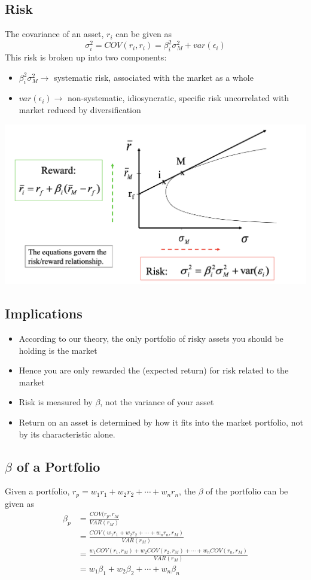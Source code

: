 \documentclass[11pt]{article}
\begin{document}
\subsection{Risk}
The covariance of an asset, $r_i$ can be given as 
$$ \sigma_i^2 = COV(r_i, r_i) = \beta_i^2\sigma^2_M + var(\epsilon_i)$$
This risk is broken up into two components:
\begin{itemize}
\item $\beta_i^2\sigma^2_M \rightarrow $ systematic risk, associated with the market as a whole
\item $ var(\epsilon_i) \rightarrow $ non-systematic,  idiosyncratic, specific risk uncorrelated with market reduced by diversification
\end{itemize}
\begin{center}
\includegraphics[scale=0.4]{images/rkrw.png} 
\end{center}

\subsection{Implications}
\begin{itemize}
\item According to our theory, the only portfolio of risky assets you should be holding is the market
\item Hence you are only rewarded the (expected return) for risk related to the market 
\item Risk is measured by $\beta$, not the variance of your asset
\item Return on an asset is determined by how it fits into the market portfolio, not by its characteristic alone.
\end{itemize}

\subsection{$\beta$ of a Portfolio}
Given a portfolio, $r_p = w_1r_1 + w_2r_2 + \cdots + w_nr_n$, the $\beta$ of the portfolio can be given as 
\begin{align*}
\beta_p &= \frac{COV(r_p, r_M}{VAR(r_M)} \\
&= \frac{COV(w_1r_1 + w_2r_2 + \cdots + w_nr_n, r_M)}{VAR(r_M)} \\
&=\frac{w_1COV(r_1, r_M) + w_2COV(r_2, r_M) + \cdots + w_nCOV(r_n, r_M)}{VAR(r_M)} \\
&= w_1\beta_1 + w_2\beta_2 + \cdots + w_n\beta_n
\end{align*}
\pagebreak
\end{document}
